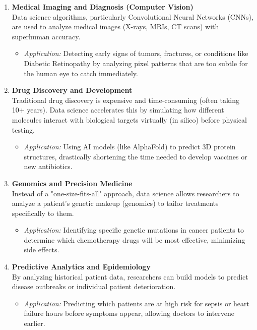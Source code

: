 \documentclass[a4paper,12pt]{article}
\begin{document}
\begin{enumerate}
    \item \textbf{Medical Imaging and Diagnosis (Computer Vision)} \\
    Data science algorithms, particularly Convolutional Neural Networks (CNNs), are used to analyze medical images (X-rays, MRIs, CT scans) with superhuman accuracy.
    \begin{itemize}
        \item \textit{Application:} Detecting early signs of tumors, fractures, or conditions like Diabetic Retinopathy by analyzing pixel patterns that are too subtle for the human eye to catch immediately.
    \end{itemize}

    \item \textbf{Drug Discovery and Development} \\
    Traditional drug discovery is expensive and time-consuming (often taking 10+ years). Data science accelerates this by simulating how different molecules interact with biological targets virtually (in silico) before physical testing.
    \begin{itemize}
        \item \textit{Application:} Using AI models (like AlphaFold) to predict 3D protein structures, drastically shortening the time needed to develop vaccines or new antibiotics.
    \end{itemize}

    \item \textbf{Genomics and Precision Medicine} \\
    Instead of a "one-size-fits-all" approach, data science allows researchers to analyze a patient's genetic makeup (genomics) to tailor treatments specifically to them.
    \begin{itemize}
        \item \textit{Application:} Identifying specific genetic mutations in cancer patients to determine which chemotherapy drugs will be most effective, minimizing side effects.
    \end{itemize}

    \item \textbf{Predictive Analytics and Epidemiology} \\
    By analyzing historical patient data, researchers can build models to predict disease outbreaks or individual patient deterioration.
    \begin{itemize}
        \item \textit{Application:} Predicting which patients are at high risk for sepsis or heart failure hours before symptoms appear, allowing doctors to intervene earlier.
    \end{itemize}
\end{enumerate}
\newpage
{}
\end{document}
